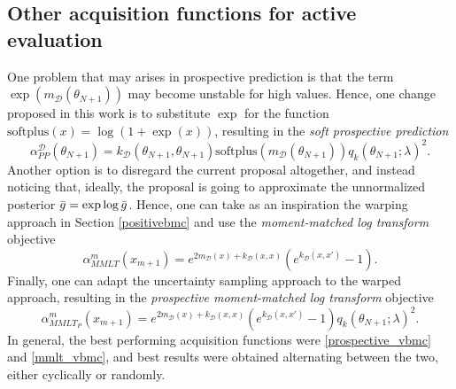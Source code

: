 \subsection{Other acquisition functions for active evaluation}
One problem that may arises in prospective prediction is that the term $\exp(m_\mathcal{D}(\theta_{N+1}))$ may become unstable for high values. Hence, one change proposed in this work is to substitute $\exp$ for the function $\text{softplus}(x) = \log(1+\exp(x))$, resulting in the \textit{soft prospective prediction}
\begin{equation}\label{soft_prospective_vbmc}
\alpha^\mathcal{D}_{PP}(\theta_{N+1}) = k_\mathcal{D}(\theta_{N+1},\theta_{N+1}) \text{softplus}(m_\mathcal{D}(\theta_{N+1}))q_k(\theta_{N+1};\lambda)^2.
\end{equation}
Another option is to disregard the current proposal altogether, and instead noticing that, ideally, the proposal is going to approximate the unnormalized posterior ${\bar{g}} = \exp \log {\bar{g}}$. Hence, one can take as an inspiration the warping approach in Section \ref{positivebmc} and use the \textit{moment-matched log transform} objective 
\begin{equation}\label{mmlt_vbmc}
\alpha^m_{MMLT}(x_{m+1}) = e^{2 m_\mathcal{D}(x) + k_\mathcal{D}(x,x)} \left(e^{k_\mathcal{D}(x,x')}-1\right).
\end{equation} 
Finally, one can adapt the uncertainty sampling approach to the warped approach, resulting in the \textit{prospective moment-matched log transform} objective
\begin{equation}\label{mmltprop_vbmc}
\alpha^m_{MMLT_P}(x_{m+1}) = e^{2 m_\mathcal{D}(x) + k_\mathcal{D}(x,x)} \left(e^{k_\mathcal{D}(x,x')}-1\right)q_k(\theta_{N+1};\lambda)^2.
\end{equation}
In general, the best performing acquisition functions were \eqref{prospective_vbmc} and \eqref{mmlt_vbmc}, and best results were obtained alternating between the two, either cyclically or randomly.

